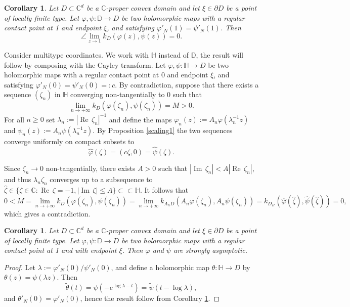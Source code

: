 \documentclass[11pt, reqno]{amsart}
\numberwithin{equation}{section}
\newtheorem{corollary}[theorem]{Corollary}
\theoremstyle{definition}
\newcommand{\C}{\mathbb{C}}
\newcommand{\D}{\mathbb{D}}
\renewcommand{\H}{\mathbb{H}}
\renewcommand{\Im}{{\operatorname{Im}\,}}
\renewcommand{\Re}{{\operatorname{Re}\,}}
\begin{document}
{		
		
		
		
		
		
		\begin{corollary}\label{approchfintyp+}
			Let $D\subset\C^d$ be a $\C$-proper convex domain and let $\xi\in\partial D$ be a point of locally finite type.
			Let $\varphi,\psi\colon\D\to D$ be two holomorphic maps with a regular contact point at 1 and endpoint $\xi$, and satisfying $\varphi'_N(1)=\psi'_N(1)$. Then	$$\angle\lim_{z\to 1}k_{D} (\varphi(z),\psi(z))=0.$$
		\end{corollary}
		
		\proof
		Consider   multitype coordinates.  We work with $\H$ instead of $\D$, the result will follow by composing with the Cayley transform.
		Let  $\varphi,\psi\colon\H\to D$ be two holomorphic maps with a regular contact point at 0 and endpoint $\xi$, and satisfying $\varphi'_N(0)=\psi'_N(0)=:c$.
		By contradiction, suppose that there exists a sequence $(\zeta_n)$ in $\H$ converging non-tangentially to 0 such that
		$$\lim_{n\to+\infty}k_{D} (\varphi(\zeta_n),\psi(\zeta_n))=M>0.$$
		For all $n\geq 0$ set $\lambda_n:=|\Re\zeta_n|^{-1}$ and  define the  maps $\varphi_n(z):=A_n\varphi(\lambda_n^{-1}z)$ and $\psi_n(z):=A_n\psi(\lambda_n^{-1}z)$. By Proposition \ref{scaling1} the two sequences converge uniformly on compact subsets to
		$$\hat{\varphi}(\zeta)=(c\zeta,0)=\hat{\psi}(\zeta).$$
		
		Since $\zeta_n\to0$ non-tangentially, there exists $A>0$ such that $|\Im\zeta_n|<A|\Re\zeta_n|$, and thus $\lambda_n\zeta_n$ converges up to a subsequence to $\hat{\zeta}\in\{\zeta\in\C: \Re\zeta=-1, |\Im\zeta|\leq A\}\subset\subset\H$. It follows that
		$$0<M=\lim_{n\to+\infty}k_{D} (\varphi(\zeta_n),\psi(\zeta_n))=\lim_{n\to+\infty}k_{A_nD} (A_n\varphi(\zeta_n),A_n\psi(\zeta_n))=k_{D_H}(\hat\varphi(\hat\zeta),\hat\psi(\hat\zeta))=0,$$
		which gives  a contradiction. 
		\endproof
		\begin{corollary}\label{approaching}
			Let $D\subset\C^d$ be a $\C$-proper convex domain and let $\xi\in\partial D$ be a point of  locally finite type. 
			Let $\varphi,\psi\colon\D\to D$ be two holomorphic maps with a regular contact point at 1 and with endpoint $\xi$. 
			Then $\varphi$ and $\psi$ are strongly asymptotic.
		\end{corollary}
		\begin{proof}
			Let $\lambda:=\varphi'_N(0)/\psi'_N(0)$, and define a holomorphic map $\theta\colon\H\to D$ by $\theta(z)=\psi(\lambda z)$.
			Then $$\tilde \theta(t)=\psi(-e^{\log\lambda-t})=\tilde\psi(t-\log\lambda),$$
			and $\theta'_N(0)=\varphi'_N(0)$, hence the result follow from Corollary \ref{approchfintyp+}.
		\end{proof}
		
}
\end{document}
